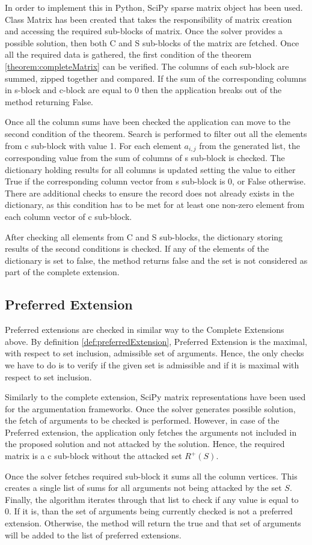 In order to implement this in Python, SciPy \citep{jones2014scipy} sparse matrix object has been used. Class Matrix has been created that takes the responsibility of matrix creation and accessing the required sub-blocks of matrix. Once the solver provides a possible solution, then both C and S sub-blocks of the matrix are fetched. Once all the required data is gathered, the first condition of the theorem \ref{theorem:completeMatrix} can be verified. The columns of each sub-block are summed, zipped together and compared. If the sum of the corresponding columns in s-block and c-block are equal to 0 then the application breaks out of the method returning False. 

Once all the column sums have been checked the application can move to the second condition of the theorem. Search is performed to filter out all the elements from c sub-block with value 1. For each element $a_{i,j}$ from the generated list, the corresponding value from the sum of columns of s sub-block is checked. The dictionary holding results for all columns is updated setting the value to either True if the corresponding column vector from s sub-block is 0, or False otherwise. There are additional checks to ensure the record does not already exists in the dictionary, as this condition has to be met for at least one non-zero element from each column vector of c sub-block.

After checking all elements from C and S sub-blocks, the dictionary storing results of the second conditions is checked. If any of the elements of the dictionary is set to false, the method returns false and the set is not considered as part of the complete extension. 

\subsection{Preferred Extension} \label{section:preferredExtension}
Preferred extensions are checked in similar way to the Complete Extensions above. By definition \ref{def:preferredExtension}, Preferred Extension is the maximal, with respect to set inclusion, admissible set of arguments. Hence, the only checks we have to do is to verify if the given set is admissible and if it is maximal with respect to set inclusion.

Similarly to the complete extension, SciPy matrix representations have been used for the argumentation frameworks. Once the solver generates possible solution, the fetch of arguments to be checked is performed. However, in case of the Preferred extension, the application only fetches the arguments not included in the proposed solution and not attacked by the solution. Hence, the required matrix is a c sub-block without the attacked set $R^+(S)$.
 
Once the solver fetches required sub-block it sums all the column vertices. This creates a single list of sums for all arguments not being attacked by the set $S$. Finally, the algorithm iterates through that list to check if any value is equal to 0. If it is, than the set of arguments being currently checked is not a preferred extension. Otherwise, the method will return the true and that set of arguments will be added to the list of preferred extensions.